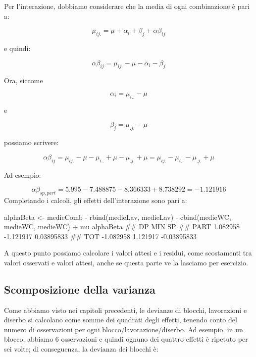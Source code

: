 \documentclass[a4paper,12pt,oneside]{book}
\newenvironment{Shaded}{\begin{snugshade}}{\end{snugshade}}
\newcommand{\SpecialCharTok}[1]{#1}
\newcommand{\DocumentationTok}[1]{#1}
\newcommand{\OtherTok}[1]{#1}
\newcommand{\FunctionTok}[1]{#1}
\newcommand{\NormalTok}[1]{#1}
\begin{document}
Per l'interazione, dobbiamo considerare che la media di ogni combinazione è pari a:

\[ \mu_{ij.} = \mu + \alpha_i + \beta_j + \alpha\beta_{ij}\]

e quindi:

\[ \alpha\beta_{ij} = \mu_{ij.} - \mu - \alpha_i - \beta_j\]

Ora, siccome

\[\alpha_i = \mu_{i..} - \mu\]

e

\[\beta_j = \mu_{.j.} - \mu\]

possiamo scrivere:

\[ \alpha\beta_{ij} = \mu_{ij.} - \mu - \mu_{i..} + \mu - \mu_{.j.} + \mu = \mu_{ij.} - \mu_{i..} - \mu_{.j.} + \mu\]

Ad esempio:

\[ \alpha\beta_{sp,part} = 5.995 - 7.488875 - 8.366333 + 8.738292 = - 1.121916\]
Completando i calcoli, gli effetti dell'interazione sono pari a:

\begin{Shaded}
\begin{Highlighting}[]
\NormalTok{alphaBeta }\OtherTok{\textless{}{-}}\NormalTok{ medieComb }\SpecialCharTok{{-}} \FunctionTok{rbind}\NormalTok{(medieLav, medieLav) }\SpecialCharTok{{-}} 
  \FunctionTok{cbind}\NormalTok{(medieWC, medieWC, medieWC) }\SpecialCharTok{+}\NormalTok{ mu}
\NormalTok{alphaBeta}
\DocumentationTok{\#\#             DP       MIN          SP}
\DocumentationTok{\#\# PART  1.082958 {-}1.121917  0.03895833}
\DocumentationTok{\#\# TOT  {-}1.082958  1.121917 {-}0.03895833}
\end{Highlighting}
\end{Shaded}

A questo punto possiamo calcolare i valori attesi e i residui, come scostamenti tra valori osservati e valori attesi, anche se questa parte ve la lasciamo per esercizio.

\hypertarget{scomposizione-della-varianza-2}{%
\subsection{Scomposizione della varianza}\label{scomposizione-della-varianza-2}}

Come abbiamo visto nei capitoli precedenti, le devianze di blocchi, lavorazioni e diserbo si calcolano come somme dei quadrati degli effetti, tenendo conto del numero di osservazioni per ogni blocco/lavorazione/diserbo. Ad esempio, in un blocco, abbiamo 6 osservazioni e quindi ognuno dei quattro effetti è ripetuto per sei volte; di conseguenza, la devianza dei blocchi è:
\end{document}
